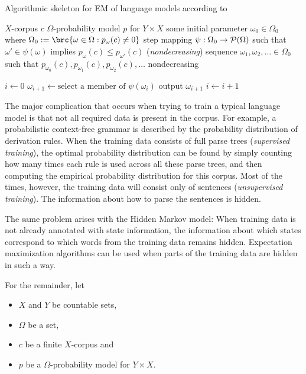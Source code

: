 \begin{algorithm}[t]
 \caption{Algorithmic skeleton for EM of language models according to \cite{bucstuvog15}}
 \label{alg:skeleton}
 \begin{algorithmic}[1]
  \algorithmheader[Input:] $X$-corpus $c$
  \algorithmheader         $\Omega$-probability model $p$ for $Y\times X$
  \algorithmheader         some initial parameter $\omega_0 \in \Omega_0$ where $\Omega_0 := \brc{\omega\in\Omega: p_\omega(c) \neq 0}$
  \algorithmheader[Implicit:] step mapping $\psi:\Omega_0\to\mathcal P(\Omega)$
  \algorithmheader            \hspace{1em} such that $\omega'\in\psi(\omega)$ implies $p_\omega(c) \leq p_{\omega'}(c)$ (\emph{nondecreasing})
  \algorithmheader[Output:] sequence $\omega_1,\omega_2,\ldots\in\Omega_0$
  \algorithmheader            \hspace{1em} such that $p_{\omega_0}(c), p_{\omega_1}(c), p_{\omega_2}(c),\ldots$ nondecreasing

  \STATE $i\leftarrow 0$
   \STATE $\omega_{i+1} \leftarrow \text{select a member of $\psi(\omega_i)$}$
   \STATE output $\omega_{i+1}$
   \STATE $i\leftarrow i+1$
  \ENDWHILE
 \end{algorithmic}
\end{algorithm}

The major complication that occurs when trying to train a typical language
model is that not all required data is present in the corpus. For example, a
probabilistic context-free grammar is described by the probability distribution
of derivation rules. \cite{laryou90} When the training data consists of full
parse trees (\emph{supervised training}), the optimal probability distribution
can be found by simply counting how many times each rule is used across all
these parse trees, and then computing the empirical probability distribution
for this corpus. Most of the times, however, the training data will consist
only of sentences (\emph{unsupervised training}). The information about how to
parse the sentences is hidden.

The same problem arises with the Hidden Markov model: When training data is not
already annotated with state information, the information about which states
correspond to which words from the training data remains hidden. Expectation
maximization algorithms can be used when parts of the training data are hidden
in such a way.

For the remainder, let
\begin{itemize}\setlength\itemsep{-0.3em}
 \item $X$ and $Y$ be countable sets,
 \item $\Omega$ be a set,
 \item $c$ be a finite $X$-corpus and
 \item $p$ be a $\Omega$-probability model for $Y\times X$.
\end{itemize}

